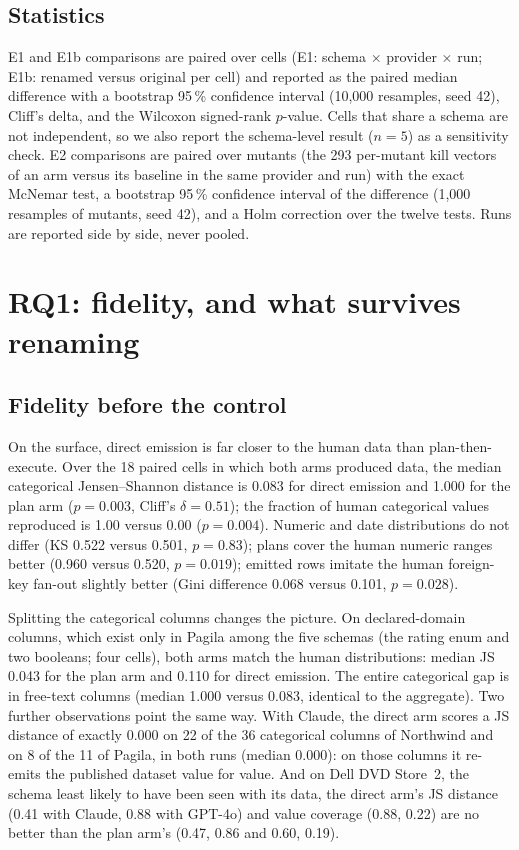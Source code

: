 \documentclass[preprint,12pt]{elsarticle}
\begin{document}
\subsection{Statistics}
E1 and E1b comparisons are paired over cells (E1: schema $\times$ provider $\times$ run; E1b: renamed versus original per cell) and reported as the paired median difference with a bootstrap 95\,\% confidence interval (10,000 resamples, seed 42), Cliff's delta, and the Wilcoxon signed-rank $p$-value. Cells that share a schema are not independent, so we also report the schema-level result ($n=5$) as a sensitivity check. E2 comparisons are paired over mutants (the 293 per-mutant kill vectors of an arm versus its baseline in the same provider and run) with the exact McNemar test, a bootstrap 95\,\% confidence interval of the difference (1,000 resamples of mutants, seed 42), and a Holm correction over the twelve tests. Runs are reported side by side, never pooled.

\section{RQ1: fidelity, and what survives renaming}
\label{sec:rq1}

\subsection{Fidelity before the control}
\label{sec:fidelity}
On the surface, direct emission is far closer to the human data than plan-then-execute. Over the 18 paired cells in which both arms produced data, the median categorical Jensen--Shannon distance is 0.083 for direct emission and 1.000 for the plan arm ($p=0.003$, Cliff's $\delta=0.51$); the fraction of human categorical values reproduced is 1.00 versus 0.00 ($p=0.004$). Numeric and date distributions do not differ (KS 0.522 versus 0.501, $p=0.83$); plans cover the human numeric ranges better (0.960 versus 0.520, $p=0.019$); emitted rows imitate the human foreign-key fan-out slightly better (Gini difference 0.068 versus 0.101, $p=0.028$).

Splitting the categorical columns changes the picture. On declared-domain columns, which exist only in Pagila among the five schemas (the rating enum and two booleans; four cells), both arms match the human distributions: median JS 0.043 for the plan arm and 0.110 for direct emission. The entire categorical gap is in free-text columns (median 1.000 versus 0.083, identical to the aggregate). Two further observations point the same way. With Claude, the direct arm scores a JS distance of exactly 0.000 on 22 of the 36 categorical columns of Northwind and on 8 of the 11 of Pagila, in both runs (median 0.000): on those columns it re-emits the published dataset value for value. And on Dell DVD Store~2, the schema least likely to have been seen with its data, the direct arm's JS distance (0.41 with Claude, 0.88 with GPT-4o) and value coverage (0.88, 0.22) are no better than the plan arm's (0.47, 0.86 and 0.60, 0.19).
\end{document}
